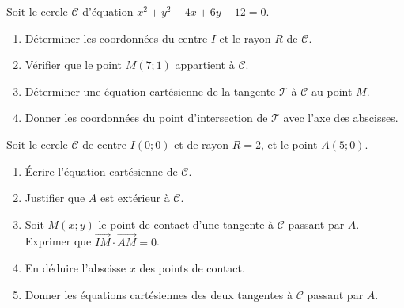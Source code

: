 \documentclass[11pt]{article}
\begin{document}
\begin{exercice}
Soit le cercle $\mathcal{C}$ d'équation $x^2+y^2-4x+6y-12=0$.
\begin{enumerate}
    \item Déterminer les coordonnées du centre $I$ et le rayon $R$ de $\mathcal{C}$.
    \item Vérifier que le point $M(7;1)$ appartient à $\mathcal{C}$.
    \item Déterminer une équation cartésienne de la tangente $\mathcal{T}$ à $\mathcal{C}$ au point $M$.
    \item Donner les coordonnées du point d'intersection de $\mathcal{T}$ avec l'axe des abscisses.
\end{enumerate}
\end{exercice}

\begin{exercice}
Soit le cercle $\mathcal{C}$ de centre $I(0;0)$ et de rayon $R=2$, et le point $A(5;0)$.
\begin{enumerate}
    \item Écrire l'équation cartésienne de $\mathcal{C}$.
    \item Justifier que $A$ est extérieur à $\mathcal{C}$.
    \item Soit $M(x;y)$ le point de contact d'une tangente à $\mathcal{C}$ passant par $A$. 
    Exprimer que $\overrightarrow{IM} \cdot \overrightarrow{AM} = 0$.
    \item En déduire l'abscisse $x$ des points de contact.
    \item Donner les équations cartésiennes des deux tangentes à $\mathcal{C}$ passant par $A$.
\end{enumerate}
\end{exercice}
\end{document}

